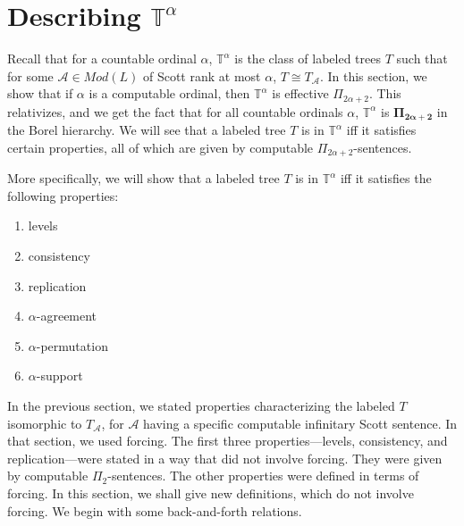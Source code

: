 \documentclass{article}
\begin{document}
\section{Describing $\mathbb{T}^\alpha$}

Recall that for a countable ordinal $\alpha$, $\mathbb{T}^\alpha$ is the class of labeled trees $T$ such that for some $\mathcal{A}\in Mod(L)$ of Scott rank at most $\alpha$, $T\cong T_\mathcal{A}$.  In this section, we show that if $\alpha$ is a computable ordinal, then $\mathbb{T}^\alpha$ is effective $\Pi_{2\alpha+2}$.  This relativizes, and we get the fact that for all countable ordinals $\alpha$, $\mathbb{T}^\alpha$ is $\mathbf{\Pi_{2\alpha+2}}$ in the Borel hierarchy.  We will see that a labeled tree $T$ is in $\mathbb{T}^\alpha$ iff it satisfies certain properties, all of which are given by computable $\Pi_{2\alpha+2}$-sentences.




More specifically, we will show that a labeled tree $T$ is in $\mathbb{T}^\alpha$ iff it satisfies the following properties:  

\begin{enumerate}

\item  levels

\item  consistency

\item  replication

\item  $\alpha$-agreement

\item  $\alpha$-permutation

\item  $\alpha$-support

\end{enumerate}

In the previous section, we stated properties characterizing the labeled $T$ isomorphic to $T_\mathcal{A}$, for $\mathcal{A}$ having a specific computable infinitary Scott sentence.  In that section, we used forcing.  The first three properties---levels, consistency, and replication---were stated in a way that did not involve forcing.  They were given by computable $\Pi_2$-sentences.  The other properties were defined in terms of forcing.  In this section, we shall give new definitions, which do not involve forcing.  We begin with some back-and-forth relations.            
\end{document}
